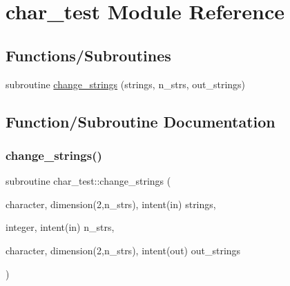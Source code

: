 \hypertarget{namespacechar__test}{}\section{char\+\_\+test Module Reference}
\label{namespacechar__test}
\subsection*{Functions/\+Subroutines}
\begin{DoxyCompactItemize}
\item 
subroutine \hyperlink{namespacechar__test_a74f23ccc17a091911ae0fd9495830dba}{change\+\_\+strings} (strings, n\+\_\+strs, out\+\_\+strings)
\end{DoxyCompactItemize}


\subsection{Function/\+Subroutine Documentation}
\mbox{\label{namespacechar__test_a74f23ccc17a091911ae0fd9495830dba}} 
\subsubsection{\texorpdfstring{change\+\_\+strings()}{change\_strings()}}
{\footnotesize\ttfamily subroutine char\+\_\+test\+::change\+\_\+strings (\begin{DoxyParamCaption}\item[{character, dimension(2,n\+\_\+strs), intent(in)}]{strings,  }\item[{integer, intent(in)}]{n\+\_\+strs,  }\item[{character, dimension(2,n\+\_\+strs), intent(out)}]{out\+\_\+strings }\end{DoxyParamCaption})}

